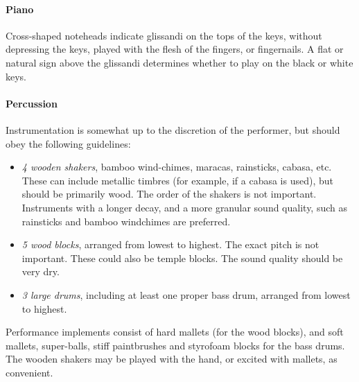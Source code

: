 \documentclass[11pt]{report}
\begin{document}
\begin{titlepage}
\begin{multicols}{3}
{    \paragraph{Piano}

    Cross-shaped noteheads indicate glissandi on the tops of the keys, without
    depressing the keys, played with the flesh of the fingers, or fingernails.
    A flat or natural sign above the glissandi determines whether to play on
    the black or white keys.

    \paragraph{Percussion}
    
    Instrumentation is somewhat up to the discretion of the performer, but
    should obey the following guidelines:

    \begin{itemize}
        
        \item \emph{4 wooden shakers}, bamboo wind-chimes, maracas, rainsticks,
        cabasa, etc. These can include metallic timbres (for example, if a
        cabasa is used), but should be primarily wood. The order of the shakers
        is not important.  Instruments with a longer decay, and a more granular
        sound quality, such as rainsticks and bamboo windchimes are preferred.

        \item \emph{5 wood blocks}, arranged from lowest to highest.  The
        exact pitch is not important. These could also be temple blocks. The
        sound quality should be very dry.

        \item \emph{3 large drums}, including at least one proper bass drum,
        arranged from lowest to highest.

    \end{itemize}

    Performance implements consist of hard mallets (for the wood blocks), and
    soft mallets, super-balls, stiff paintbrushes and styrofoam blocks for the
    bass drums. The wooden shakers may be played with the hand, or excited with
    mallets, as convenient.

}

\end{multicols}
\end{titlepage}
\end{document}
